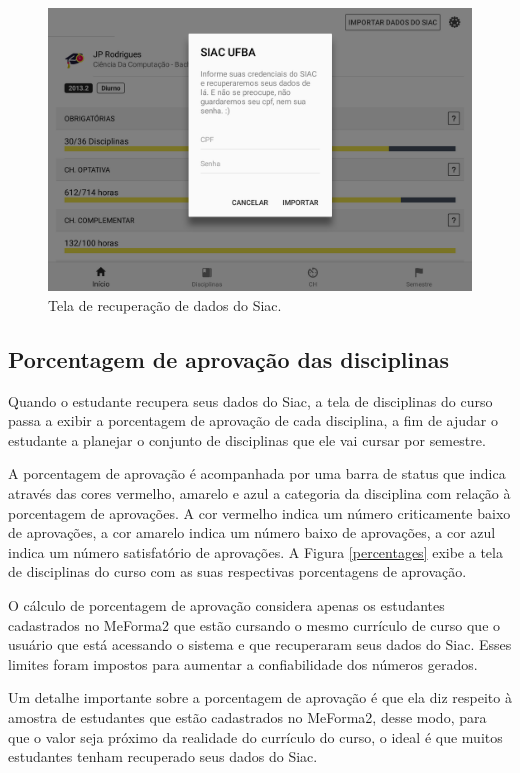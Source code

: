 \begin{figure}[H]
	   \centering
	   		\includegraphics[scale=0.25]{pics/c3/13-siac.png}
	   \caption{Tela de recuperação de dados do Siac.}
	   \label{siac}
\end{figure}

\subsection{Porcentagem de aprovação das disciplinas}

Quando o estudante recupera seus dados do Siac, a tela de disciplinas do curso passa a exibir a porcentagem de aprovação de cada disciplina, a fim de ajudar o estudante a planejar o conjunto de disciplinas que ele vai cursar por semestre.

A porcentagem de aprovação é acompanhada por uma barra de status que indica através das cores vermelho, amarelo e azul a categoria da disciplina com relação à porcentagem de aprovações. A cor vermelho indica um número criticamente baixo de aprovações, a cor amarelo indica um número baixo de aprovações, a cor azul indica um número satisfatório de aprovações. A Figura \ref{percentages} exibe a tela de disciplinas do curso com as suas respectivas porcentagens de aprovação.

O cálculo de porcentagem de aprovação considera apenas os estudantes cadastrados no MeForma2 que estão cursando o mesmo currículo de curso que o usuário que está acessando o sistema e que recuperaram seus dados do Siac. Esses limites foram impostos para aumentar a confiabilidade dos números gerados.

Um detalhe importante sobre a porcentagem de aprovação é que ela diz respeito à amostra de estudantes que estão cadastrados no MeForma2, desse modo, para que o valor seja próximo da realidade do currículo do curso, o ideal é que muitos estudantes tenham recuperado seus dados do Siac.


